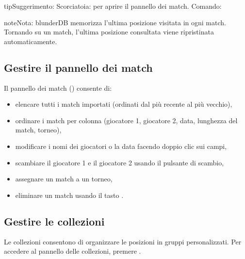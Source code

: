 \documentclass[letterpaper,10pt,italian]{sphinxmanual}
\begin{document}
\begin{sphinxadmonition}{tip}{Suggerimento:}
\sphinxAtStartPar
Scorciatoia:  per aprire il pannello dei match. Comando: 
\end{sphinxadmonition}

\begin{sphinxadmonition}{note}{Nota:}
\sphinxAtStartPar
blunderDB memorizza l’ultima posizione visitata in ogni match. Tornando su un match, l’ultima posizione consultata viene ripristinata automaticamente.
\end{sphinxadmonition}


\subsection{Gestire il pannello dei match}
\label{\detokenize{guide_utilisateur:gerer-le-panneau-des-matchs}}
\sphinxAtStartPar
Il pannello dei match () consente di:
\begin{itemize}
\item {} 
\sphinxAtStartPar
elencare tutti i match importati (ordinati dal più recente al più vecchio),

\item {} 
\sphinxAtStartPar
ordinare i match per colonna (giocatore 1, giocatore 2, data, lunghezza del match, torneo),

\item {} 
\sphinxAtStartPar
modificare i nomi dei giocatori o la data facendo doppio clic sui campi,

\item {} 
\sphinxAtStartPar
scambiare il giocatore 1 e il giocatore 2 usando il pulsante di scambio,

\item {} 
\sphinxAtStartPar
assegnare un match a un torneo,

\item {} 
\sphinxAtStartPar
eliminare un match usando il tasto .

\end{itemize}


\subsection{Gestire le collezioni}
\label{\detokenize{guide_utilisateur:gerer-les-collections}}
\sphinxAtStartPar
Le collezioni consentono di organizzare le posizioni in gruppi personalizzati. Per accedere al pannello delle collezioni, premere .
\end{document}
